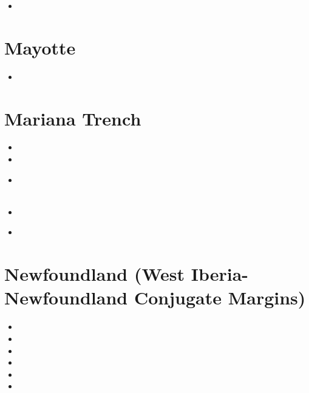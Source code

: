 \begin{small}
\begin{itemize}
\item[\twothousandtwenty]
\end{itemize}
\end{small}

\section{Mayotte}

\begin{small}
\begin{itemize}
\item[\twothousandtwentyfour]
\end{itemize}
\end{small}

\section{Mariana Trench}

\begin{small}
\begin{itemize}
\item[1978]
\item[\nineteenninetytwo]
\item[\twothousandfifteen]
\\
\\
\item[\twothousandeighteen]
\item[\twothousandtwentythree]
\\
\end{itemize}
\end{small}


\section{Newfoundland (West Iberia-Newfoundland Conjugate Margins)}

\begin{small}
\begin{itemize}
\item[1998] 
\item[2006] 
\item[2016] 
\item[2017] 
\item[2023]  
\item[2025] 
\end{itemize}
\end{small}




